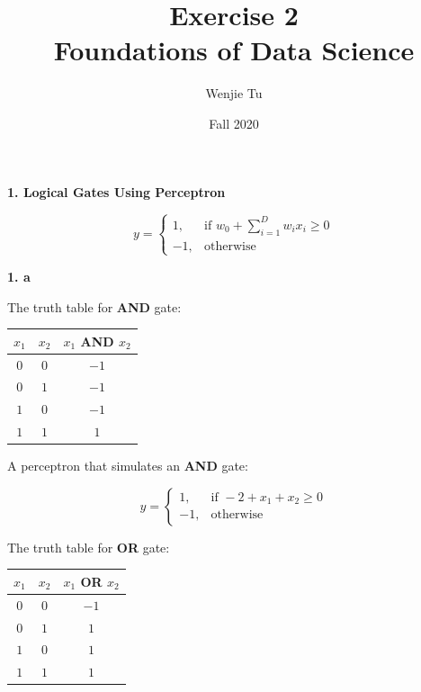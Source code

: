 \documentclass{article}
\title{%
    Exercise 2 \\
    \large Foundations of Data Science 
}
\author{Wenjie Tu}
\date{Fall 2020}
\begin{document}
\maketitle

\textbf{1. Logical Gates Using Perceptron}

\[y=
    \begin{cases}
    1, & \textrm{if } w_0+\sum_{i=1}^{D}w_ix_i\geq 0 \\
    -1, & \textrm{otherwise}
    \end{cases}
\]

\textbf{1. a}

The truth table for \textbf{AND} gate:

\begin{table}[h]
    \centering
    \begin{tabular}{c|c|c}
    \hline
    $x_1$ & $x_2$ & $x_1$ AND $x_2$  \\
    \hline 
    $ 0 $ & $ 0 $ & $ -1 $ \\
    \hline
    $ 0 $ & $ 1 $ & $ -1 $ \\
    \hline
    $ 1 $ & $ 0 $ & $ -1 $ \\
    \hline
    $ 1 $ & $ 1 $ & $  1 $ \\
    \hline
    \end{tabular}
\end{table}

A perceptron that simulates an \textbf{AND} gate:

\[
y=
\begin{cases}
    1, & \textrm{if } -2+x_1+x_2\geq 0 \\
    -1, & \textrm{otherwise}
\end{cases}
\]

The truth table for \textbf{OR} gate:

\begin{table}[h]
    \centering
    \begin{tabular}{c|c|c}
    \hline
    $x_1$ & $x_2$ & $x_1$ OR $x_2$  \\
    \hline 
    $ 0 $ & $ 0 $ & $ -1 $ \\
    \hline
    $ 0 $ & $ 1 $ & $  1 $ \\
    \hline
    $ 1 $ & $ 0 $ & $  1 $ \\
    \hline
    $ 1 $ & $ 1 $ & $  1 $ \\
    \hline
    \end{tabular}
\end{table}
\end{document}
